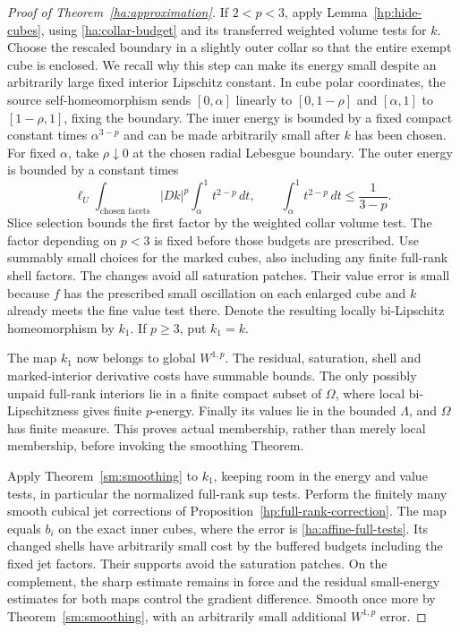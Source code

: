 \begin{proof}[Proof of Theorem~\ref{ha:approximation}]
If $2<p<3$, apply Lemma~\ref{hp:hide-cubes}, using
\eqref{ha:collar-budget} and its transferred weighted volume tests
for $k$.  Choose the rescaled boundary in a slightly outer collar
so that the entire exempt cube is enclosed.  We recall why this
step can make its energy small despite an arbitrarily large fixed
interior Lipschitz constant.  In cube polar coordinates, the source
self-homeomorphism sends $[0,\alpha]$ linearly to $[0,1-\rho]$ and
$[\alpha,1]$ to $[1-\rho,1]$, fixing the boundary.  The inner energy
is bounded by a fixed compact constant times $\alpha^{3-p}$ and
can be made arbitrarily small after $k$ has been chosen.  For fixed
$\alpha$, take $\rho\downarrow0$ at the chosen radial Lebesgue
boundary.  The outer energy is bounded by a constant times
\[
 \ell_U\int_{\text{chosen facets}}|Dk|^p
                     \int_\alpha^1 t^{2-p}\,dt,
 \qquad \int_\alpha^1 t^{2-p}\,dt\le \frac{1}{3-p}.
\]
Slice selection bounds the first factor by the weighted collar
volume test.  The factor depending on $p<3$ is fixed before those
budgets are prescribed.  Use summably small choices for the marked
cubes, also including any finite full-rank shell factors.  The changes
avoid all saturation patches.  Their value error is small because
$f$ has the prescribed small oscillation on each enlarged cube and
$k$ already meets the fine value test there.  Denote the resulting
locally bi-Lipschitz homeomorphism by $k_1$.  If $p\ge3$, put
$k_1=k$.

The map $k_1$ now belongs to global $W^{1,p}$.  The residual,
saturation, shell and marked-interior derivative costs have summable
bounds.  The only possibly unpaid full-rank interiors lie in a
finite compact subset of $\Omega$, where local bi-Lipschitzness
gives finite $p$-energy.  Finally its values lie in the bounded
$\Lambda$, and $\Omega$ has finite measure.  This proves actual
membership, rather than merely local membership, before invoking
the smoothing Theorem.

Apply Theorem~\ref{sm:smoothing} to $k_1$, keeping room in the
energy and value tests, in particular the normalized full-rank
sup tests.  Perform the finitely many smooth cubical jet corrections
of Proposition~\ref{hp:full-rank-correction}.  The map equals $b_i$
on the exact inner cubes, where the error is
\eqref{ha:affine-full-tests}.  Its changed shells have arbitrarily
small cost by the buffered budgets including the fixed jet factors.
Their supports avoid the saturation patches.  On the complement,
the sharp estimate remains in force and the residual small-energy
estimates for both maps control the gradient difference.  Smooth
once more by Theorem~\ref{sm:smoothing}, with an arbitrarily small
additional $W^{1,p}$ error.


\end{proof}
